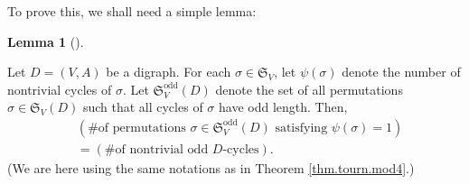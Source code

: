 \documentclass[numbers=enddot,12pt,final,onecolumn,notitlepage]{scrartcl}%
\numberwithin{exer}{section}
\theoremstyle{definition}
\newtheorem{lem}[theo]{Lemma}
\newenvironment{lemma}[1][]
{\begin{lem}[#1]\begin{leftbar}}
{\end{leftbar}\end{lem}}
\begin{document}
To prove this, we shall need a simple lemma:

\begin{lemma}
\label{lem.psi=1}Let $D=\left(  V,A\right)  $ be a digraph. For each
$\sigma\in\mathfrak{S}_{V}$, let $\psi\left(  \sigma\right)  $ denote the
number of nontrivial cycles of $\sigma$. Let $\mathfrak{S}_{V}%
^{\operatorname*{odd}}\left(  D\right)  $ denote the set of all permutations
$\sigma\in\mathfrak{S}_{V}\left(  D\right)  $ such that all cycles of $\sigma$
have odd length. Then,%
\begin{align*}
&  \left(  \text{\# of permutations }\sigma\in\mathfrak{S}_{V}%
^{\operatorname*{odd}}\left(  D\right)  \text{ satisfying }\psi\left(
\sigma\right)  =1\right) \\
&  =\left(  \text{\# of nontrivial odd }D\text{-cycles}\right)  .
\end{align*}
(We are here using the same notations as in Theorem \ref{thm.tourn.mod4}.)
\end{lemma}
\end{document}
